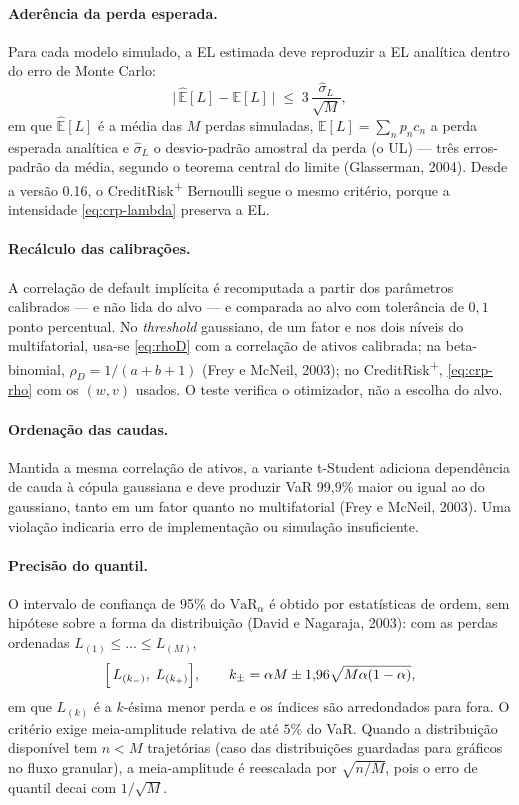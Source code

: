 \documentclass[11pt,a4paper]{article}
\newcommand{\VaR}{\mathrm{VaR}}
\newcommand{\E}{\mathbb{E}}
\begin{document}
\paragraph{Aderência da perda esperada.} Para cada modelo simulado, a EL estimada deve reproduzir a EL analítica dentro do erro de Monte Carlo:
\begin{equation}
\bigl|\,\widehat{\E}[L]-\E[L]\,\bigr| \;\le\; 3\,\frac{\widehat{\sigma}_L}{\sqrt{M}},
\label{eq:diag-el}
\end{equation}
em que $\widehat{\E}[L]$ é a média das $M$ perdas simuladas, $\E[L]=\sum_n p_n c_n$ a perda esperada analítica e $\widehat{\sigma}_L$ o desvio-padrão amostral da perda (o UL) --- três erros-padrão da média, segundo o teorema central do limite (Glasserman, 2004). Desde a versão 0.16, o CreditRisk\textsuperscript{+} Bernoulli segue o mesmo critério, porque a intensidade \eqref{eq:crp-lambda} preserva a EL.

\paragraph{Recálculo das calibrações.} A correlação de default implícita é recomputada a partir dos parâmetros calibrados --- e não lida do alvo --- e comparada ao alvo com tolerância de $0{,}1$ ponto percentual. No \emph{threshold} gaussiano, de um fator e nos dois níveis do multifatorial, usa-se \eqref{eq:rhoD} com a correlação de ativos calibrada; na beta-binomial, $\rho_D=1/(a+b+1)$ (Frey e McNeil, 2003); no CreditRisk\textsuperscript{+}, \eqref{eq:crp-rho} com os $(w,v)$ usados. O teste verifica o otimizador, não a escolha do alvo.

\paragraph{Ordenação das caudas.} Mantida a mesma correlação de ativos, a variante t-Student adiciona dependência de cauda à cópula gaussiana e deve produzir VaR 99{,}9\% maior ou igual ao do gaussiano, tanto em um fator quanto no multifatorial (Frey e McNeil, 2003). Uma violação indicaria erro de implementação ou simulação insuficiente.

\paragraph{Precisão do quantil.} O intervalo de confiança de 95\% do $\VaR_\alpha$ é obtido por estatísticas de ordem, sem hipótese sobre a forma da distribuição (David e Nagaraja, 2003): com as perdas ordenadas $L_{(1)}\le\dots\le L_{(M)}$,
\begin{equation}
\Bigl[\,L_{(k_-)},\;L_{(k_+)}\Bigr],
\qquad
k_\pm=\alpha M \pm 1{,}96\sqrt{M\alpha(1-\alpha)},
\label{eq:diag-ic}
\end{equation}
em que $L_{(k)}$ é a $k$-ésima menor perda e os índices são arredondados para fora. O critério exige meia-amplitude relativa de até $5\%$ do VaR. Quando a distribuição disponível tem $n<M$ trajetórias (caso das distribuições guardadas para gráficos no fluxo granular), a meia-amplitude é reescalada por $\sqrt{n/M}$, pois o erro de quantil decai com $1/\sqrt{M}$.
\end{document}
